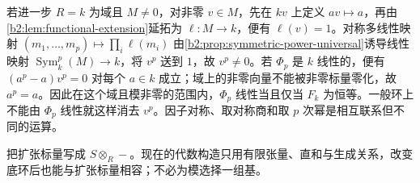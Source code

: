 \ProseParagraphBreak
若进一步 \(R=k\) 为域且 \(M\ne0\)，对非零 \(v\in M\)，先在 \(kv\) 上定义 \(av\mapsto a\)，再由\cref{b2:lem:functional-extension}延拓为 \(\ell:M\to k\)，便有 \(\ell(v)=1\)。对称多线性映射 \((m_1,\ldots,m_p)\mapsto\prod_i\ell(m_i)\) 由\cref{b2:prop:symmetric-power-universal}诱导线性映射 \(\operatorname{Sym}_k^p(M)\to k\)，将 \(v^p\) 送到 \(1\)，故 \(v^p\ne0\)。若 \(\Phi_p\) 是 \(k\) 线性的，便有 \((a^p-a)v^p=0\) 对每个 \(a\in k\) 成立；域上的非零向量不能被非零标量零化，故 \(a^p=a\)。因此在这个域且模非零的范围内，\(\Phi_p\) 线性当且仅当 \(F_k\) 为恒等。一般环上不能由 \(\Phi_p\) 线性就这样消去 \(v^p\)。因子对称、取对称商和取 \(p\) 次幂是相互联系但不同的运算。

\ProseParagraphBreak
{}把扩张标量写成 \(S\otimes_R-\)。现在的代数构造只用有限张量、直和与生成关系，改变底环后也能与扩张标量相容；不必为模选择一组基。

